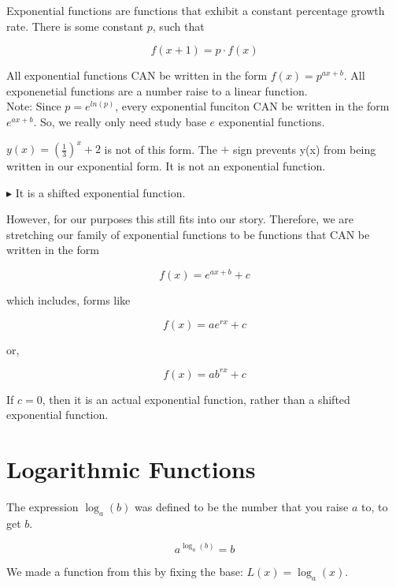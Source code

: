 \documentclass{ximera}
\begin{document}
\begin{warning}

Exponential functions are functions that exhibit a constant percentage growth rate.  There is some constant $p$, such that

\[
f(x+1) = p \cdot f(x)
\]


All exponential functions CAN be written in the form $f(x) = p^{a x + b}$.  All exponenetial functions are a number raise to a linear function.  \\


Note: Since $p = e^{ln(p)}$, every exponential funciton CAN be written in the form $e^{a x + b}$.  So, we really only need study base $e$ exponential functions.



$y(x) = \left(\frac{1}{3}\right)^x + 2$ is not of this form.  The $+$ sign prevents y(x) from being written in our exponential form.  It is not an exponential function.

$\blacktriangleright$ It is a shifted exponential function.


However, for our purposes this still fits into our story.  Therefore, we are stretching our family of exponential functions to be functions that CAN be written in the form

\[
f(x) = e^{a x + b} + c
\]

which includes, forms like



\[
f(x) = a e^{r x} + c
\]

or,

\[
f(x) = a b^{r x} + c
\]



If $c = 0$, then it is an actual exponential function, rather than a shifted exponential function.


\end{warning}






\section{Logarithmic Functions}

The expression $\log_a(b)$ was defined to be the number that you raise $a$ to, to get $b$.

\[   a^{\log_a(b)} = b  \]




We made a function from this by fixing the base:  $L(x) = \log_a(x)$.
\end{document}
